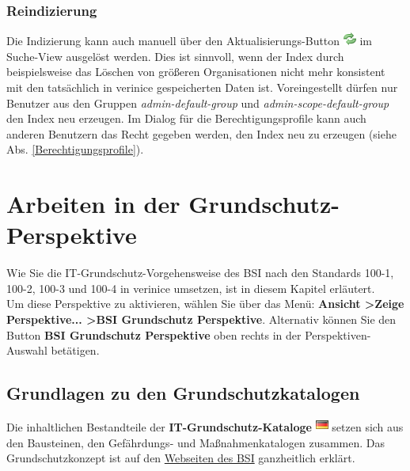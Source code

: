 \documentclass[a4paper,10pt]{book}
\begin{document}
\subsection{Reindizierung}
\label{sec:indizierung}

Die Indizierung kann auch manuell über den
Aktualisierungs-Button \includegraphics[height=2ex]{Icon/Aktualisieren.png}
im Suche-View ausgelöst werden. Dies ist sinnvoll, wenn der Index
durch beispielsweise das Löschen von größeren Organisationen nicht
mehr konsistent mit den tatsächlich in verinice gespeicherten Daten
ist. Voreingestellt dürfen nur Benutzer aus den Gruppen \textit{admin-default-group} und \textit{admin-scope-default-group} den Index neu erzeugen.
Im Dialog für die Berechtigungsprofile kann auch anderen Benutzern das Recht gegeben werden, den Index neu zu erzeugen (siehe Abs. \ref{Berechtigungsprofile}).



\chapter{Arbeiten in der Grundschutz-Perspektive}
\label{Arbeiten in der Grundschutz-Perspektive}
Wie Sie die IT-Grundschutz-Vorgehensweise des BSI nach den Standards 100-1, 100-2, 100-3 und 100-4 in verinice umsetzen,
ist in diesem Kapitel erläutert.
\newline\\
Um diese Perspektive zu aktivieren, wählen Sie über das Menü: \textbf{Ansicht \textgreater Zeige Perspektive... \textgreater BSI Grundschutz Perspektive}.
Alternativ können Sie den Button \textbf{BSI Grundschutz Perspektive} oben rechts in der Perspektiven-Auswahl betätigen.

\section{Grundlagen zu den Grundschutzkatalogen}
Die inhaltlichen Bestandteile der \textbf{IT-Grundschutz-Kataloge} \includegraphics[height=2ex]{Icon/GS_Kataloge.png} setzen sich
aus den Bausteinen, den Gefährdungs- und Maßnahmenkatalogen zusammen. Das Grundschutzkonzept ist auf
den \href{https://www.bsi.bund.de/cln_156/DE/Themen/weitereThemen/ITGrundschutzKataloge/itgrundschutzkataloge_node.html}{Webseiten des BSI}
ganzheitlich erklärt.
\end{document}
